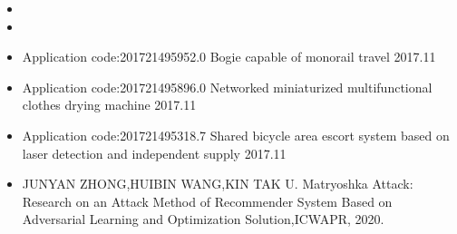 \newpage
{}
  \begin{itemize}[leftmargin=*]
    \item {}
    \item {}
    
  \end{itemize}
  \begin{itemize}[leftmargin=*]
    \item{Application code:201721495952.0 Bogie capable of monorail travel 2017.11}
    \item {Application code:201721495896.0 Networked miniaturized multifunctional 
clothes drying machine 2017.11}
    \item {Application code:201721495318.7 Shared bicycle area escort system based 
on laser detection and independent supply 2017.11}
     \item {JUNYAN ZHONG,HUIBIN WANG,KIN TAK U. Matryoshka Attack: Research on an Attack Method of Recommender System Based on Adversarial Learning and Optimization Solution,ICWAPR, 2020. } 
  \end{itemize}